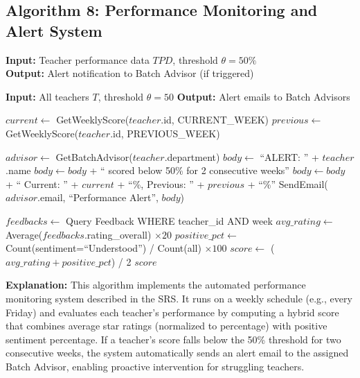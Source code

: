 \subsection{Algorithm 8: Performance Monitoring and Alert System}

\textbf{Input:} Teacher performance data $TPD$, threshold $\theta = 50\%$ \\
\textbf{Output:} Alert notification to Batch Advisor (if triggered)

\begin{algorithm}[H]
\caption{Weekly Performance Monitor and Alert}
\begin{algorithmic}[1]

\State \textbf{Input:} All teachers $T$, threshold $\theta = 50$
\State \textbf{Output:} Alert emails to Batch Advisors

        \State $current \gets$ GetWeeklyScore($teacher$.id, CURRENT\_WEEK)
        \State $previous \gets$ GetWeeklyScore($teacher$.id, PREVIOUS\_WEEK)
        
            \State $advisor \gets$ GetBatchAdvisor($teacher$.department)
            \State $body \gets$ ``ALERT: '' + $teacher$.name
            \State $body \gets body$ + `` scored below 50\% for 2 consecutive weeks''
            \State $body \gets body$ + `` Current: '' + $current$ + ``\%, Previous: '' + $previous$ + ``\%''
            \State SendEmail($advisor$.email, ``Performance Alert'', $body$)
        \EndIf
    \EndFor
\EndFunction


    \State $feedbacks \gets$ Query Feedback WHERE teacher\_id AND week
    \State $avg\_rating \gets$ Average($feedbacks$.rating\_overall) $\times 20$
    \State $positive\_pct \gets$ Count(sentiment=``Understood'') / Count(all) $\times 100$
    \State $score \gets$ ($avg\_rating + positive\_pct$) / 2
    \State \Return $score$
\EndFunction

\end{algorithmic}
\end{algorithm}

\textbf{Explanation:}
This algorithm implements the automated performance monitoring system described in the SRS. It runs on a weekly schedule (e.g., every Friday) and evaluates each teacher's performance by computing a hybrid score that combines average star ratings (normalized to percentage) with positive sentiment percentage. If a teacher's score falls below the 50\% threshold for two consecutive weeks, the system automatically sends an alert email to the assigned Batch Advisor, enabling proactive intervention for struggling teachers.


